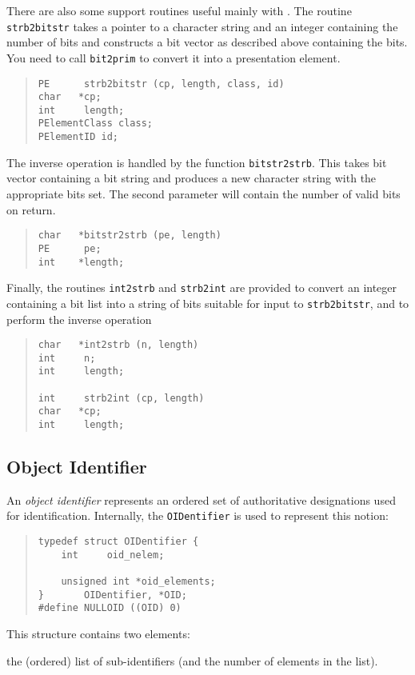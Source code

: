 There are also some support routines useful mainly with .
The routine \verb"strb2bitstr" takes a pointer to a character
string and an integer containing the number of bits and constructs
a bit vector as described above containing the bits.
You need to call \verb"bit2prim" to convert it into a presentation element.
\begin{quote}\small\begin{verbatim}
PE      strb2bitstr (cp, length, class, id)
char   *cp;
int     length;
PElementClass class;
PElementID id;
\end{verbatim}\end{quote}
The inverse operation is handled by the function \verb"bitstr2strb".
This takes bit vector containing a bit string and produces
a new character string with the appropriate bits set. The second
parameter will contain the number of valid bits on return.
\begin{quote}\small\begin{verbatim}
char   *bitstr2strb (pe, length)
PE      pe;
int    *length;
\end{verbatim}\end{quote}
Finally, the routines \verb"int2strb" and \verb"strb2int" are provided to
convert an integer containing a bit list into a string of bits suitable for
input to \verb"strb2bitstr", and to perform the inverse operation
\begin{quote}\small\begin{verbatim}
char   *int2strb (n, length)
int     n;
int     length;

int     strb2int (cp, length)
char   *cp;
int     length;
\end{verbatim}\end{quote}

\subsection	{Object Identifier}\label{psap:oid}
An {\em object identifier\/} represents an ordered set of authoritative
designations used for identification.
Internally,
the \verb"OIDentifier" is used to represent this notion:
\begin{quote}\small\begin{verbatim}
typedef struct OIDentifier {
    int     oid_nelem;

    unsigned int *oid_elements;
}       OIDentifier, *OID;
#define NULLOID ((OID) 0)
\end{verbatim}\end{quote}
This structure contains two elements:
\begin{describe}
\item[\verb"oid\_elements"/\verb"oid\_nelem":] the (ordered) list of
sub-identifiers (and the number of elements in the list).
\end{describe}

